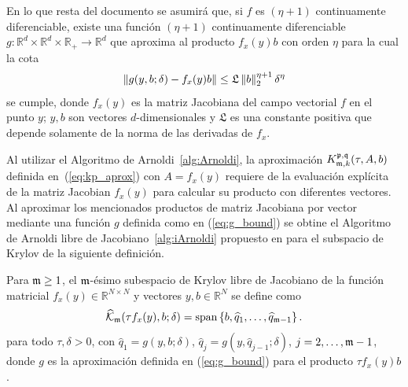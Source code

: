 En lo que resta del documento se asumirá que, si $f$ es $(\eta+1)$  continuamente diferenciable, existe una función $(\eta+1)$ continuamente diferenciable $g: \mathbb{R}^{d}\times \mathbb{R}^{d} \times \mathbb{R}_+ \to \mathbb{R}^{d}$ que aproxima al producto $f_x(y)b$ con orden $\eta$ para la cual la cota
\begin{equation} \label{eq:g_bound}
	\left\lVert g(y,b;\delta)-f_x(y)b \right\rVert \leq \mathfrak{L}\left\lVert b \right\rVert_2^{\eta+1}\delta^{\eta}
\end{equation}
se cumple, donde $f_x(y)$ es la matriz Jacobiana del campo vectorial $f$ en el punto $y$; $y,b$ son vectores $d$-dimensionales y $\mathfrak{L}$ es una constante positiva que depende solamente de la norma de las derivadas de $f_x$.

Al utilizar el Algoritmo de Arnoldi~\ref{alg:Arnoldi}, la aproximación $K_{\mathfrak{m},k}^{\mathfrak{p},\mathfrak{q}}(\tau,A,b)$ definida en~(\ref{eq:kp_aprox}) con $A=f_x(y)$ requiere de la evaluación explícita de la matriz Jacobian $f_x(y)$ para calcular su producto con diferentes vectores. Al aproximar los mencionados productos de matriz Jacobiana por vector mediante una función $g$ definida como en (\ref{eq:g_bound}) se obtine el Algoritmo de Arnoldi libre de Jacobiano~\ref{alg:iArnoldi} propuesto en \cite{brown1987local} para el subspacio de Krylov de la siguiente definición. 
\begin{definition}
	\cite{brown1987local} Para $\mathfrak{m}\geq 1$, el $\mathfrak{m}$-ésimo subespacio de Krylov libre de Jacobiano de la función matricial $f_x(y)\in\mathbb{R}^{N\times N}$
	y vectores $y,b\in\mathbb{R}^{N}$ se define como
	\[ \widehat{\mathcal{K}}_{\mathfrak{m}}(\tau f_x(y),b;\delta)=\mathrm{span} \left\{ b,\widehat{q}_1,\ldots,\widehat{q}_{\mathfrak{m}-1} \right\}. \]
	para todo $\tau, \delta > 0$, con $\widehat{q}_1=g(y,b;\delta)$, $\widehat{q}_j=g(y,\widehat{q}_{j-1};\delta)$, $j=2,\ldots,\mathfrak{m}-1$, donde $g$ es la aproximación definida en (\ref{eq:g_bound}) para el producto $\tau f_x(y)b$.
\end{definition}

